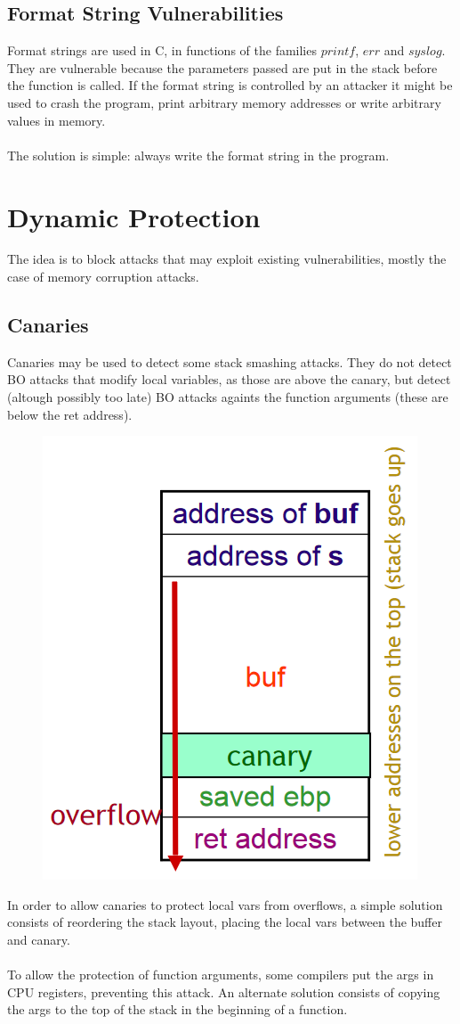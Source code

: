 \documentclass[10pt,a4paper]{report}
\begin{document}
\subsection{Format String Vulnerabilities}
Format strings are used in C, in functions of the families $printf$, $err$ and $syslog$. They are vulnerable because the parameters passed are put in the stack before the function is called. If the format string is controlled by an attacker it might be used to crash the program, print arbitrary memory addresses or write arbitrary values in memory.\\
\\
The solution is simple: always write the format string in the program.
\section{Dynamic Protection}
The idea is to block attacks that may exploit existing vulnerabilities, mostly the case of memory corruption attacks.
\subsection{Canaries}
Canaries may be used to detect some stack smashing attacks. They do not detect BO attacks that modify local variables, as those are above the canary, but detect (altough possibly too late) BO attacks againts the function arguments (these are below the ret address).
\begin{figure}[H]
\centering
\includegraphics[scale=0.4]{15.png}
\end{figure}
In order to allow canaries to protect local vars from overflows, a simple solution consists of reordering the stack layout, placing the local vars between the buffer and canary.\\
\\
To allow the protection of function arguments, some compilers put the args in CPU registers, preventing this attack. An alternate solution consists of copying the args to the top of the stack in the beginning of a function.
\end{document}
